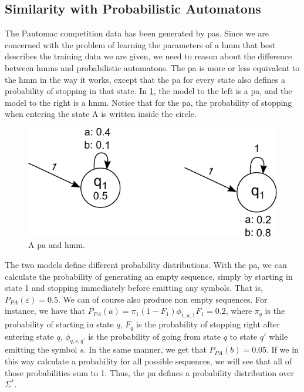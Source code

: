 \subsection{Similarity with Probabilistic Automatons}
The Pautomac competition data has been generated by \gls{pa}s. Since we are concerned with the problem of learning the parameters of a \gls{hmm} that best describes the training data we are given, we need to reason about the difference between \gls{hmm}s and probabilistic automatons. The \gls{pa} is more or less equivalent to the \gls{hmm} in the way it works, except that the \gls{pa} for every state also defines a probability of stopping in that state.
In \ref{fig:model-with-and-without-stop-symbols}, the model to the left is a \gls{pa}, and the model to the right is a \gls{hmm}.
Notice that for the \gls{pa}, the probability of stopping when entering the state A is written inside the circle.

\begin{figure}
\begin{centering}
\includegraphics[scale=1]{./pictures/model-with-and-without-stop-symbols}
\caption{A \gls{pa} and \gls{hmm}.}
\label{fig:model-with-and-without-stop-symbols}
\end{centering}
\end{figure}

The two models define different probability distributions.
With the \gls{pa}, we can calculate the probability of generating an empty sequence, simply by starting in state 1 and stopping immediately before emitting any symbols. That is, $P_{PA}(\varepsilon) = 0.5$. We can of course also produce non empty sequences. For instance, we have that $P_{PA}(a) = \pi_1(1-F_1)\phi_{1,a,1}F_1 = 0.2$, where $\pi_q$ is the probability of starting in state $q$, $F_q$ is the probability of stopping right after entering state $q$, $\phi_{q,s,q'}$ is the probability of going from state $q$ to state $q'$ while emitting the symbol $s$.
In the same manner, we get that $P_{PA}(b) = 0.05$.
If we in this way calculate a probability for all possible sequences, we will see that all of those probabilities sum to 1. Thus, the \gls{pa} defines a probability distribution over $\Sigma^\ast$\cite{Dupont:2005:LPA:1746577.1746601}.

